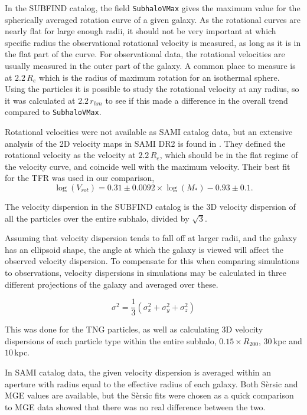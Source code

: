 In the SUBFIND catalog, the field \texttt{SubhaloVMax} gives the maximum value for the spherically averaged rotation curve of a given galaxy. As the rotational curves are nearly flat for large enough radii, it should not be very important at which specific radius the observational rotational velocity is measured, as long as it is in the flat part of the curve. For observational data, the rotational velocities are usually measured in the outer part of the galaxy. A common place to measure is at $2.2\, R_e$ which is the radius of maximum rotation for an isothermal sphere. Using the particles it is possible to study the rotational velocity at any radius, so it was calculated at $2.2\, r_{hm}$ to see if this made a difference in the overall trend compared to \texttt{SubhaloVMax}. 

Rotational velocities were not available as SAMI catalog data, but an extensive analysis of the 2D velocity maps in SAMI DR2 is found in \textcite{Bloom2017}. They defined the rotational velocity as the velocity at $2.2\, R_e$, which should be in the flat regime of the velocity curve, and coincide well with the maximum velocity. Their best fit for the TFR was used in our comparison, 
\begin{equation}
	\log(V_{rot}) = 0.31 \pm 0.0092 \times \log(M_*)-0.93 \pm 0.1.
\end{equation}



The velocity dispersion in the SUBFIND catalog is the 3D velocity dispersion of all the particles over the entire subhalo, divided by $\sqrt{3}$.

Assuming that velocity dispersion tends to fall off at larger radii, and the galaxy has an ellipsoid shape, the angle at which the galaxy is viewed will affect the observed velocity dispersion. To compensate for this when comparing simulations to observations, velocity dispersions in simulations may be calculated in three different projections of the galaxy and averaged over these. 

\begin{equation} \label{sigma1}
    \sigma^{2} = \frac{1}{3}(\sigma_x^2 + \sigma_y^2 + \sigma_z^2)
\end{equation}

This was done for the TNG particles, as well as calculating 3D velocity dispersions of each particle type within the entire subhalo, $0.15 \times R_{200}$, $30\,$kpc and $10\,$kpc.

In SAMI catalog data, the given velocity dispersion is averaged within an aperture with radius equal to the effective radius of each galaxy. Both Sèrsic and MGE values are available, but the Sèrsic fits were chosen as a quick comparison to MGE data showed that there was no real difference between the two.

